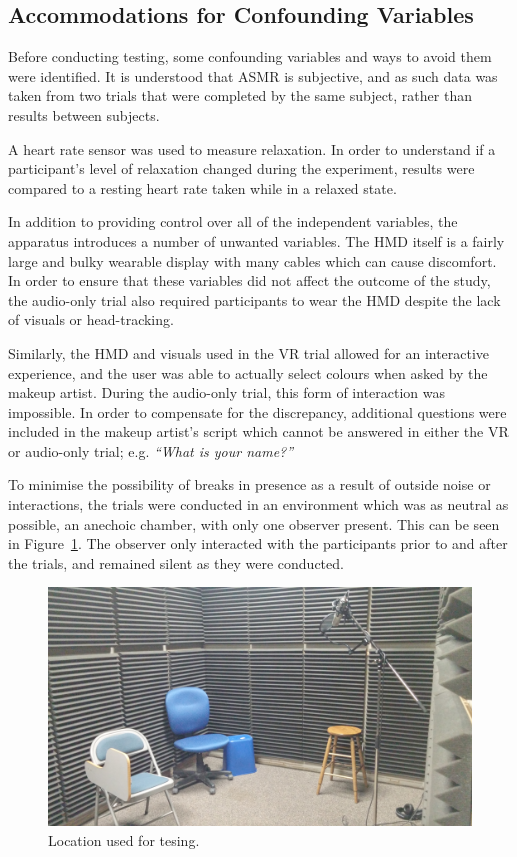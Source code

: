 \documentclass{sigchi}
\newcommand{\inlinequote}[1]{\textit{``#1''}}
\begin{document}
\subsection{Accommodations for Confounding Variables}
Before conducting testing, some confounding variables and ways to avoid them were identified. It is understood that ASMR is subjective, and as such data was taken from two trials that were completed by the same subject, rather than results between subjects. 

A heart rate sensor was used to measure relaxation. In order to understand if a participant's level of relaxation changed during the experiment, results were compared to a resting heart rate taken while in a relaxed state.

In addition to providing control over all of the independent variables, the apparatus introduces a number of unwanted variables. The HMD itself is a fairly large and bulky wearable display with many cables which can cause discomfort. In order to ensure that these variables did not affect the outcome of the study, the audio-only trial also required participants to wear the HMD despite the lack of visuals or head-tracking.

Similarly, the HMD and visuals used in the VR trial allowed for an interactive experience, and the user was able to actually select colours when asked by the makeup artist. During the audio-only trial, this form of interaction was impossible. In order to compensate for the discrepancy, additional questions were included in the makeup artist's script which cannot be answered in either the VR or audio-only trial; e.g. \inlinequote{What is your name?}

To minimise the possibility of breaks in presence as a result of outside noise or interactions, the trials were conducted in an environment which was as neutral as possible, an anechoic chamber, with only one observer present. This can be seen in Figure~\ref{fig:soundroom}. The observer only interacted with the participants prior to and after the trials, and remained silent as they were conducted.

\begin{figure}[htb]
\centering
  \includegraphics[width=0.9\columnwidth]{figures/soundroom}
  \caption{Location used for tesing.}
  \label{fig:soundroom}
\end{figure}
\end{document}
